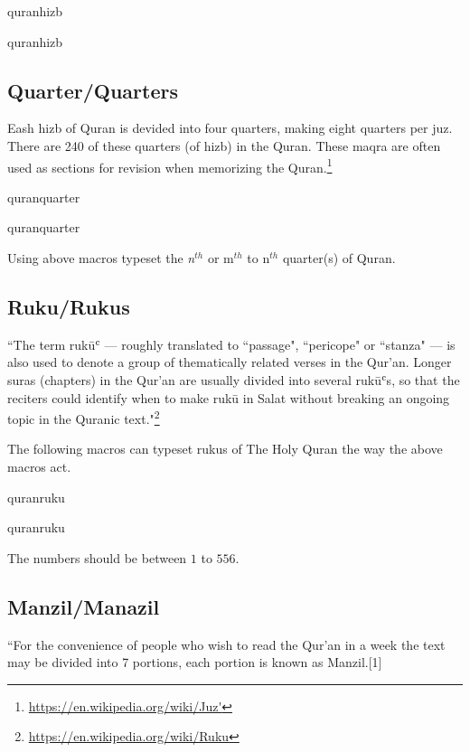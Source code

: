 \documentclass{ltxdoc}
\begin{document}
\begin{declcs}{quranhizb}
\end{declcs}
\begin{declcs}{quranhizb}
\end{declcs}

\subsection{Quarter/Quarters}
Eash hizb of Quran is devided into four quarters, making eight quarters per juz. 
There are 240 of these quarters (of hizb) in the Quran. These maqra are often used as sections for revision when memorizing the Quran.\footnote{\url{https://en.wikipedia.org/wiki/Juz'}}
\begin{declcs}{quranquarter}
\end{declcs}
\begin{declcs}{quranquarter}
\end{declcs}

Using above macros typeset the \textit{n}$^{th}$ or m$^{th}$ to n$^{th}$ quarter(s) of Quran.   

\subsection{Ruku/Rukus}
``The term ruk\= uʿ --- roughly translated to ``passage", ``pericope" or ``stanza" --- is also used to denote a group of thematically related verses in the Qur'an. Longer suras (chapters) in the Qur'an are usually divided into several rukūʿs, so that the reciters could identify when to make ruk\= u in Salat without breaking an ongoing topic in the Quranic text."\footnote{\url{https://en.wikipedia.org/wiki/Ruku}}

The following macros can typeset rukus of The Holy Quran the way the above macros act. 

\begin{declcs}{quranruku}
\end{declcs}
\begin{declcs}{quranruku}
\end{declcs}
The numbers should be between $1$ to $556$.

\subsection{Manzil/Manazil}
``For the convenience of people who wish to read the Qur'an in a week the text may be divided into 7 portions, each portion is known as Manzil.[1]
\end{document}
